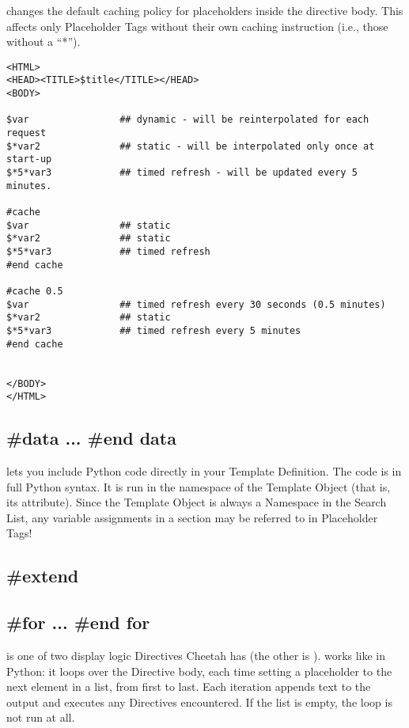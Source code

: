 { changes the default caching policy for placeholders inside the
directive body.  This affects only Placeholder Tags without their own caching
instruction (i.e., those without a ``*'').

\begin{verbatim}
<HTML>
<HEAD><TITLE>$title</TITLE></HEAD>
<BODY>

$var                ## dynamic - will be reinterpolated for each request
$*var2              ## static - will be interpolated only once at start-up
$*5*var3            ## timed refresh - will be updated every 5 minutes.

#cache
$var                ## static
$*var2              ## static
$*5*var3            ## timed refresh
#end cache

#cache 0.5
$var                ## timed refresh every 30 seconds (0.5 minutes)
$*var2              ## static
$*5*var3            ## timed refresh every 5 minutes
#end cache


</BODY>
</HTML>
\end{verbatim}


\subsection{\#data ... \#end data}

 lets you include Python code directly in your Template 
Definition.  The code is in full Python syntax.  It is run in the namespace of
the Template Object (that is, its  attribute).  Since the Template
Object is always a Namespace in the Search List, any variable assignments in a
 section may be referred to in Placeholder Tags!

\subsection{\#extend}



\subsection{\#for ... \#end for}

 is one of two display logic Directives Cheetah has (the other is
).   works like in Python: it loops over the Directive
body, each time setting a placeholder to the next element in a list, from first
to last.  Each iteration appends text to the output and executes any
Directives encountered.  If the list is empty, the loop is not run at all.

}
